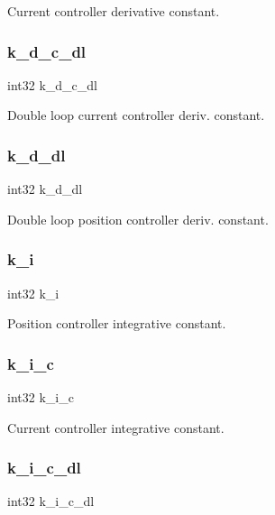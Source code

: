 Current controller derivative constant. \mbox{\label{structst__motor_af8bfba55a00d54c9c2a9e4bb11484158}} 
\subsubsection{k\+\_\+d\+\_\+c\+\_\+dl}
{\footnotesize\ttfamily int32 k\+\_\+d\+\_\+c\+\_\+dl}

Double loop current controller deriv. constant. \mbox{\label{structst__motor_adc3d57142df06bc753d1982fa409ffea}} 
\subsubsection{k\+\_\+d\+\_\+dl}
{\footnotesize\ttfamily int32 k\+\_\+d\+\_\+dl}

Double loop position controller deriv. constant. \mbox{\label{structst__motor_ad62fb8a39e2de160e14be47e3ff08014}} 
\subsubsection{k\+\_\+i}
{\footnotesize\ttfamily int32 k\+\_\+i}

Position controller integrative constant. \mbox{\label{structst__motor_a942ea80eb197a70dd0ba3da33d1e6c6e}} 
\subsubsection{k\+\_\+i\+\_\+c}
{\footnotesize\ttfamily int32 k\+\_\+i\+\_\+c}

Current controller integrative constant. \mbox{\label{structst__motor_afc912f90d6ba2f39046a0daf0207f116}} 
\subsubsection{k\+\_\+i\+\_\+c\+\_\+dl}
{\footnotesize\ttfamily int32 k\+\_\+i\+\_\+c\+\_\+dl}

